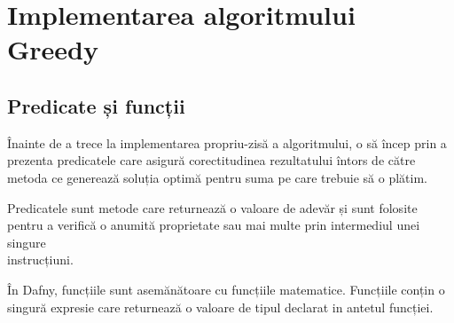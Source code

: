 \section{Implementarea algoritmului Greedy}
\subsection{Predicate și funcții }
Înainte de a trece la implementarea propriu-zisă a algoritmului, o să încep prin a prezenta predicatele care asigură corectitudinea rezultatului întors de către metoda ce generează soluția optimă pentru suma pe care trebuie să o plătim. \par 
Predicatele sunt metode care returnează o valoare de adevăr și sunt folosite pentru a verifică o anumită proprietate sau mai multe prin intermediul unei singure \\ instrucțiuni.
\par
În Dafny, funcțiile sunt asemănătoare cu funcțiile matematice. Funcțiile conțin o singură expresie care returnează o valoare de tipul declarat in antetul funcției.


